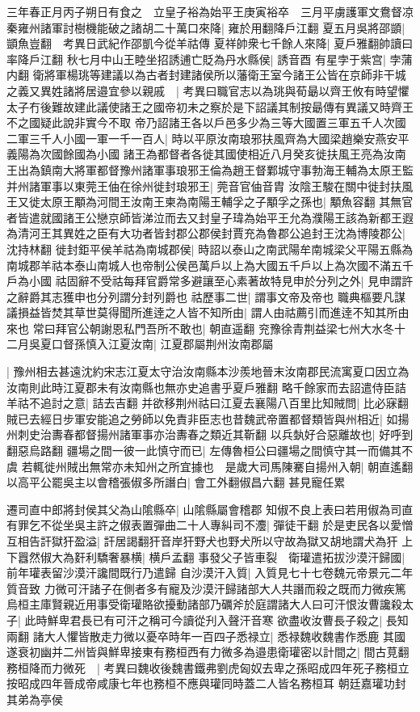三年春正月丙子朔日有食之　立皇子裕為始平王庚寅裕卒　三月平虜護軍文鴦督凉秦雍州諸軍討樹機能破之諸胡二十萬口來降|{
	雍於用翻降戶江翻}
夏五月吳將邵顗|{
	顗魚豈翻　考異日武紀作邵凱今從羊祜傳}
夏祥帥衆七千餘人來降|{
	夏戶雅翻帥讀曰率降戶江翻}
秋七月中山王睦坐招誘逋亡貶為丹水縣侯|{
	誘音酉}
有星孛于紫宫|{
	孛蒲内翻}
衛將軍楊珧等建議以為古者封建諸侯所以藩衛王室今諸王公皆在京師非干城之義又異姓諸將居邉宜參以親戚　|{
	考異曰職官志以為珧與荀朂以齊王攸有時望懼太子冇後難故建此議使諸王之國帝初未之察於是下詔議其制按朂傳有異議又時齊王不之國疑此說非實今不取}
帝乃詔諸王各以戶邑多少為三等大國置三軍五千人次國二軍三千人小國一軍一千一百人|{
	時以平原汝南琅邪扶風齊為大國梁趙樂安燕安平義陽為次國餘國為小國}
諸王為都督者各徙其國使相近八月癸亥徙扶風王亮為汝南王出為鎮南大將軍都督豫州諸軍事琅邪王倫為趙王督鄴城守事勃海王輔為太原王監并州諸軍事以東莞王伷在徐州徙封琅邪王|{
	莞音官伷音胄}
汝陰王駿在關中徙封扶風王又徙太原王顒為河間王汝南王柬為南陽王輔孚之子顒孚之孫也|{
	顒魚容翻}
其無官者皆遣就國諸王公戀京師皆涕泣而去又封皇子瑋為始平王允為濮陽王該為新都王遐為清河王其異姓之臣有大功者皆封郡公郡侯封賈充為魯郡公追封王沈為博陵郡公|{
	沈持林翻}
徙封鉅平侯羊祜為南城郡侯|{
	時詔以泰山之南武陽牟南城梁父平陽五縣為南城郡羊祜本泰山南城人也帝制公侯邑萬戶以上為大國五千戶以上為次國不滿五千戶為小國}
祜固辭不受祜每拜官爵常多避讓至心素著故特見申於分列之外|{
	見申謂許之辭爵其志獲申也分列謂分封列爵也}
祜歷事二世|{
	謂事文帝及帝也}
職典樞要凡謀議損益皆焚其草世莫得聞所進逹之人皆不知所由|{
	謂人由祜薦引而進逹不知其所由來也}
常曰拜官公朝謝恩私門吾所不敢也|{
	朝直遥翻}
兖豫徐青荆益梁七州大水冬十二月吳夏口督孫慎入江夏汝南|{
	江夏郡屬荆州汝南郡屬}


|{
	豫州相去甚遠沈約宋志江夏太守治汝南縣本沙羨地晉末汝南郡民流寓夏口因立為汝南則此時江夏郡未有汝南縣也無亦史追書乎夏戶雅翻}
略千餘家而去詔遣侍臣詰羊祜不追討之意|{
	詰去吉翻}
并欲移荆州祜曰江夏去襄陽八百里比知賊問|{
	比必寐翻}
賊已去經日步軍安能追之勞師以免責非臣志也昔魏武帝置都督類皆與州相近|{
	如揚州刺史治夀春都督揚州諸軍事亦治夀春之類近其靳翻}
以兵埶好合惡離故也|{
	好呼到翻惡烏路翻}
疆場之間一彼一此慎守而已|{
	左傳魯桓公曰疆場之間慎守其一而備其不虞}
若輒徙州賊出無常亦未知州之所宜據也　是歲大司馬陳騫自揚州入朝|{
	朝直遙翻}
以高平公罷吳主以會稽張俶多所譖白|{
	會工外翻俶昌六翻}
甚見寵任累

遷司直中郎將封侯其父為山隂縣卒|{
	山隂縣屬會稽郡}
知俶不良上表曰若用俶為司直有罪乞不從坐吳主許之俶表置彈曲二十人專糾司不灋|{
	彈徒干翻}
於是吏民各以愛憎互相告訐獄犴盈溢|{
	訐居謁翻犴音岸犴野犬也野犬所以守故為獄又胡地謂犬為犴}
上下囂然俶大為姧利驕奢暴横|{
	横戶孟翻}
事發父子皆車裂　衛瓘遣拓拔沙漠汗歸國|{
	前年瓘表留沙漠汗讒間既行乃遣歸}
自沙漠汗入質|{
	入質見七十七卷魏元帝景元二年質音致}
力微可汗諸子在側者多有寵及沙漠汗歸諸部大人共譖而殺之既而力微疾篤烏桓主庫賢親近用事受衛瓘賂欲擾動諸部乃礪斧於庭謂諸大人曰可汗恨汝曹讒殺太子|{
	此時鮮卑君長已有可汗之稱可今讀從刋入聲汗音寒}
欲盡收汝曹長子殺之|{
	長知兩翻}
諸大人懼皆散走力微以憂卒時年一百四子悉禄立|{
	悉禄魏收魏書作悉鹿}
其國遂衰初幽并二州皆與鮮卑接東有務桓西有力微多為邉患衛瓘密以計間之|{
	間古莧翻}
務桓降而力微死　|{
	考異曰魏收後魏書鐵弗劉虎匈奴去卑之孫昭成四年死子務桓立按昭成四年晉成帝咸康七年也務桓不應與瓘同時蓋二人皆名務桓耳}
朝廷嘉瓘功封其弟為亭侯

